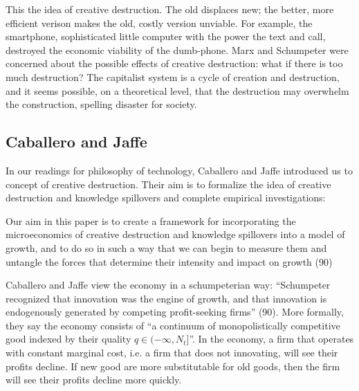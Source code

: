 \documentclass[11pt]{article}
\begin{document}
This the idea of creative destruction.
The old displaces new; the better, more efficient verison makes the old, costly version unviable.
For example, the smartphone, sophisticated little computer with the power the text and call, destroyed the economic viability of the dumb-phone.
Marx and Schumpeter were concerned about the possible effects of creative destruction: what if there is too much destruction?
The capitalist system is a cycle of creation and destruction, and it seems possible, on a theoretical level, that the destruction may overwhelm the construction, spelling disaster for society.

\subsection{Caballero and Jaffe}
In our readings for philosophy of technology, Caballero and Jaffe introduced us to concept of creative destruction.
Their aim is to formalize the idea of creative destruction and knowledge spillovers and complete empirical investigations:
\begin{displayquote}
    Our aim in this paper is to create a framework for incorporating the microeconomics of creative destruction and knowledge spillovers into a model of growth, and to do so in such a way that we can begin to measure them and untangle the forces that determine their intensity and impact on growth (90)
\end{displayquote}

Caballero and Jaffe view the economy in a schumpeterian way: ``Schumpeter recognized that innovation was the engine of growth, and that innovation is endogenously generated by competing profit-seeking firms'' (90). 
More formally, they say the economy consists of ``a continuum of monopolistically competitive good indexed by their quality $q \in (-\infty, N_t]$''.
In the economy, a firm that operates with constant marginal cost, i.e. a firm that does not innovating, will see their profits decline. 
If new good are more substitutable for old goods, then the firm will see their profits decline more quickly.
\end{document}
